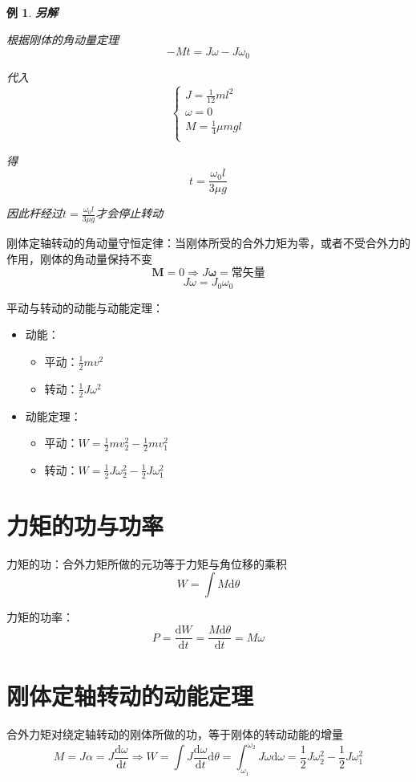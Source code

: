 \documentclass[12pt, a4paper, twoside]{ctexbook}
\newtheorem{example}[theorem]{例}
\begin{document}
\begin{example}
    \noindent\textbf{另解}

    根据刚体的角动量定理
    $$
    -Mt=J\omega-J\omega_0
    $$

    代入
    $$
    \left\{ \begin{array}{l}
	    J=\frac{1}{12}ml^2   \\
	    \omega =0  \\
	    M=\frac{1}{4}\mu mgl    \\
    \end{array} \right. 
    $$

    得
    $$
    t=\frac{\omega_0l}{3\mu g}
    $$

    因此杆经过$t=\frac{\omega_0l}{3\mu g}$才会停止转动
\end{example}
{\sonti 刚体定轴转动的角动量守恒定律}：当刚体所受的合外力矩为零，或者不受合外力的作用，刚体的角动量保持不变
$$
\boldsymbol{M}=0 \Rightarrow J\boldsymbol{\omega}=\text{常矢量}
$$
$$
J\omega=J_0\omega_0
$$

{\sonti 平动与转动的动能与动能定理}：
\begin{itemize}
    \item {\sonti 动能}：
    \begin{itemize}
        \item 平动：$\frac{1}{2}mv^2$
        \item 转动：$\frac{1}{2}J\omega^2$
    \end{itemize}
    \item {\sonti 动能定理}：
    \begin{itemize}
        \item 平动：$W=\frac{1}{2}mv_2^2-\frac{1}{2}mv_1^2$
        \item 转动：$W=\frac{1}{2}J\omega_2^2-\frac{1}{2}J\omega_1^2$
    \end{itemize}
\end{itemize}
\section{力矩的功与功率}
{\sonti 力矩的功}：合外力矩所做的元功等于力矩与角位移的乘积
$$
W=\int M\mathrm{d}\theta
$$

{\sonti 力矩的功率}：
$$
P=\frac{\mathrm{d}W}{\mathrm{d}t}=\frac{M\mathrm{d}\theta}{\mathrm{d}t}=M\omega
$$
\section{刚体定轴转动的动能定理}
合外力矩对绕定轴转动的刚体所做的功，等于刚体的转动动能的增量
$$
M=J\alpha=J\frac{\mathrm{d}\omega}{\mathrm{d}t} \Rightarrow W=\int J\frac{\mathrm{d}\omega}{\mathrm{d}t}\mathrm{d}\theta=\int_{\omega_1}^{\omega_2} J\omega\mathrm{d}\omega=\frac{1}{2}J\omega_2^2-\frac{1}{2}J\omega_1^2
$$
\end{document}
